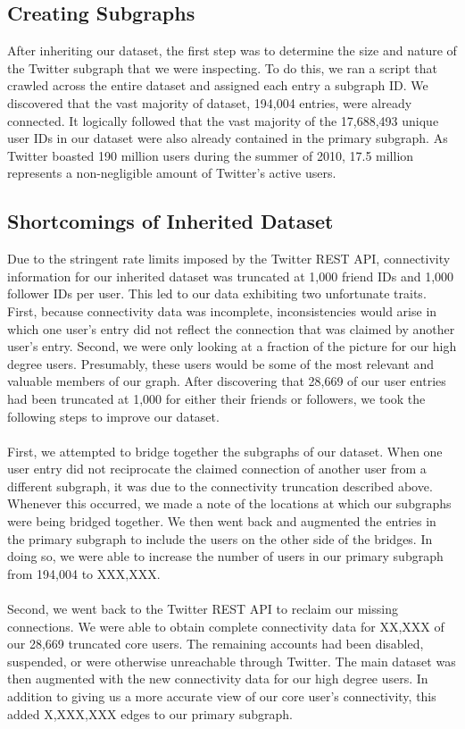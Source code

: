 \subsection{Creating Subgraphs}
After inheriting our dataset, the first step was to determine the size and nature of the Twitter subgraph that we were inspecting.  To do this, we ran a script that crawled across the entire dataset and assigned each entry a subgraph ID.  We discovered that the vast majority of dataset, 194,004 entries, were already connected.  It logically followed that the vast majority of the 17,688,493 unique user IDs in our dataset were also already contained in the primary subgraph.  As Twitter boasted 190 million users during the summer of 2010, 17.5 million represents a non-negligible amount of Twitter's active users.

\subsection{Shortcomings of Inherited Dataset}
Due to the stringent rate limits imposed by the Twitter REST API, connectivity information for our inherited dataset was truncated at 1,000 friend IDs and 1,000 follower IDs per user.  This led to our data exhibiting two unfortunate traits.  First, because connectivity data was incomplete, inconsistencies would arise in which one user's entry did not reflect the connection that was claimed by another user's entry.  Second, we were only looking at a fraction of the picture for our high degree users.  Presumably, these users would be some of the most relevant and valuable members of our graph.  After discovering that 28,669 of our user entries had been truncated at 1,000 for either their friends or followers, we took the following steps to improve our dataset.\\\\
First, we attempted to bridge together the subgraphs of our dataset.  When one user entry did not reciprocate the claimed connection of another user from a different subgraph, it was due to the connectivity truncation described above.  Whenever this occurred, we made a note of the locations at which our subgraphs were being bridged together.  We then went back and augmented the entries in the primary subgraph to include the users on the other side of the bridges.  In doing so, we were able to increase the number of users in our primary subgraph from 194,004 to XXX,XXX.\\\\
Second, we went back to the Twitter REST API to reclaim our missing connections.  We were able to obtain complete connectivity data for XX,XXX of our 28,669 truncated core users.  The remaining accounts had been disabled, suspended, or were otherwise unreachable through Twitter.  The main dataset was then augmented with the new connectivity data for our high degree users.  In addition to giving us a more accurate view of our core user's connectivity, this added X,XXX,XXX edges to our primary subgraph.\\\\
